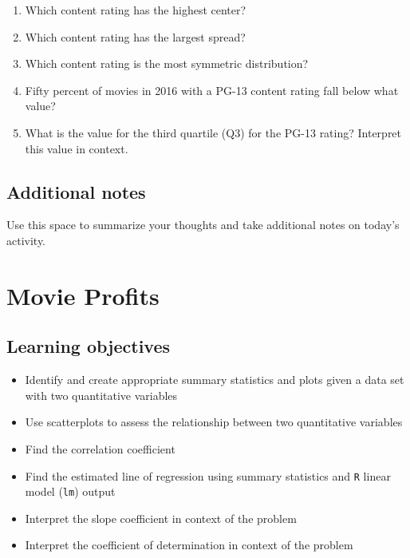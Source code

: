 \documentclass[
]{report}
\begin{document}
\begin{enumerate}
\def\labelenumi{\alph{enumi}.}
\item
  Which content rating has the highest center?
  \vspace{0.2in}
\item
  Which content rating has the largest spread?
  \vspace{0.2in}
\item
  Which content rating is the most symmetric distribution?
  \vspace{0.2in}
\item
  Fifty percent of movies in 2016 with a PG-13 content rating fall below what value?
  \vspace{0.2in}
\item
  What is the value for the third quartile (Q3) for the PG-13 rating? Interpret this value in context.
  \vspace{.5in}
\end{enumerate}

\newpage

\hypertarget{additional-notes}{%
\section{Additional notes}\label{additional-notes}}

Use this space to summarize your thoughts and take additional notes on today's activity.

\hypertarget{movie-profits}{%
\chapter{Movie Profits}\label{movie-profits}}

\hypertarget{learning-objectives}{%
\section{Learning objectives}\label{learning-objectives}}

\begin{itemize}
\item
  Identify and create appropriate summary statistics and plots
  given a data set with two quantitative variables
\item
  Use scatterplots to assess the relationship between two quantitative variables
\item
  Find the correlation coefficient
\item
  Find the estimated line of regression using summary statistics and \texttt{R} linear model (\texttt{lm}) output
\item
  Interpret the slope coefficient in context of the problem
\item
  Interpret the coefficient of determination in context of the problem
\end{itemize}
\end{document}
